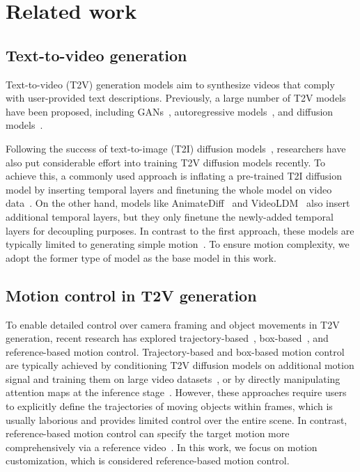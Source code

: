 \section{Related work}
\label{sec:related_work}

\subsection{Text-to-video generation}
\label{sec:t2v}

Text-to-video (T2V) generation models aim to synthesize videos that comply with user-provided text descriptions. Previously, a large number of T2V models have been proposed, including GANs~\cite{gan1, gan2, gan3, gan4}, autoregressive models~\cite{ar1, ar2, ar3, ar4}, and diffusion models~\cite{vdm, vldm, cogvideo}.

Following the success of text-to-image (T2I) diffusion models~\cite{dm1, dm2, dm3}, researchers have also put considerable effort into training T2V diffusion models recently. To achieve this, a commonly used approach is inflating a pre-trained T2I diffusion model by inserting temporal layers and finetuning the whole model on video data~\cite{modelscope, videocrafter, latentvdm, imagen, makeavideo, show1, lavie}. On the other hand, models like AnimateDiff~\cite{animatediff} and VideoLDM~\cite{vldm} also insert additional temporal layers, but they only finetune the newly-added temporal layers for decoupling purposes. In contrast to the first approach, these models are typically limited to generating simple motion~\cite{animatezero}. To ensure motion complexity, we adopt the former type of model as the base model in this work.

\subsection{Motion control in T2V generation}
\label{sec:motion_control}

To enable detailed control over camera framing and object movements in T2V generation, recent research has explored trajectory-based~\cite{dragnuwa, mctrl, draga, moft}, box-based~\cite{mb, trailblazer, peekaboo, boximator}, and reference-based motion control. Trajectory-based and box-based motion control are typically achieved by conditioning T2V diffusion models on additional motion signal and training them on large video datasets~\cite{dragnuwa, draga, mctrl, boximator}, or by directly manipulating attention maps at the inference stage~\cite{mb, trailblazer, peekaboo}. However, these approaches require users to explicitly define the trajectories of moving objects within frames, which is usually laborious and provides limited control over the entire scene. In contrast, reference-based motion control can specify the target motion more comprehensively via a reference video~\cite{mc, md, vmc, dmt, sma}. In this work, we focus on motion customization, which is considered reference-based motion control.

